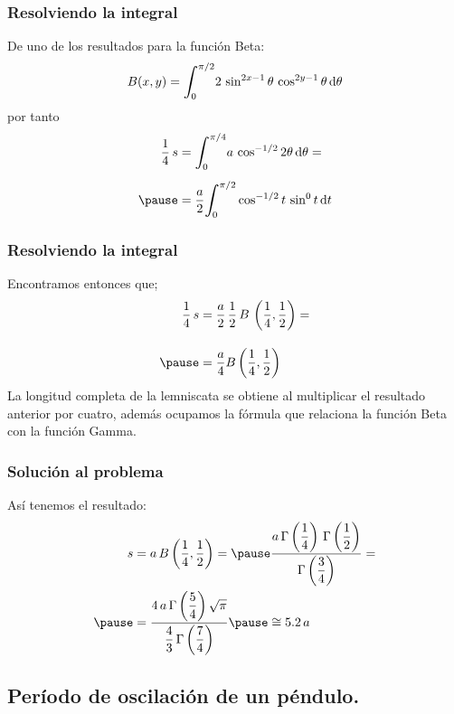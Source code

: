 \documentclass[12pt]{beamer}
\begin{document}
\begin{frame}
\frametitle{Resolviendo la integral}
De uno de los resultados para la función Beta:
\begin{align*}
B(x, y) = \scaleint{6ex}_{\bs {0}}^{\pi/2} 2 \, \sin^{2x-1} \theta \, \cos^{2y-1} \theta \dd{\theta}
\end{align*}
\pause
por tanto
\begin{eqnarray*}
\begin{aligned}
\dfrac{1}{4} \, s &= \scaleint{6ex}_{\bs {0}}^{\pi/4} a \, \cos^{-1/2} 2 \theta \dd{\theta} =  \\[0.5em] \pause
&= \dfrac{a}{2} \scaleint{6ex}_{\bs {0}}^{\pi/2} \cos^{-1/2} t \, \sin^{0} t \dd{t}
\end{aligned}
\end{eqnarray*}
\end{frame}
\begin{frame}
\frametitle{Resolviendo la integral}
Encontramos entonces que;
\begin{eqnarray*}
\begin{aligned}
\dfrac{1}{4} \, s &= \dfrac{a}{2} \, \dfrac{1}{2} \, B \, \left(\dfrac{1}{4}, \dfrac{1}{2} \right) = \\[1em] \pause
&= \dfrac{a}{4} B\left(\dfrac{1}{4}, \dfrac{1}{2} \right)
\end{aligned}
\end{eqnarray*}
\pause
\fontsize{12}{12}\selectfont
La longitud completa de la lemniscata se obtiene al multiplicar el resultado anterior por cuatro, además ocupamos la fórmula que relaciona la función Beta con la función Gamma.
\end{frame}
\begin{frame}
\frametitle{Solución al problema}
Así tenemos el resultado:
\begin{eqnarray*}
\begin{aligned}
s &= a \, B\left(\dfrac{1}{4}, \dfrac{1}{2} \right) = \pause \dfrac{a \, \Gamma \left( \dfrac{1}{4} \right) \, \Gamma \left( \dfrac{1}{2} \right) }{\Gamma \left( \dfrac{3}{4} \right)} = \\ \pause
&= \dfrac{4 \, a \, \Gamma \left( \dfrac{5}{4} \right) \sqrt{\pi}}{\dfrac{4}{3} \, \Gamma \left( \dfrac{7}{4} \right)} \pause \cong 5.2 \, a
\end{aligned}
\end{eqnarray*}
\end{frame}

\subsection{Período de oscilación de un péndulo.}
\end{document}
